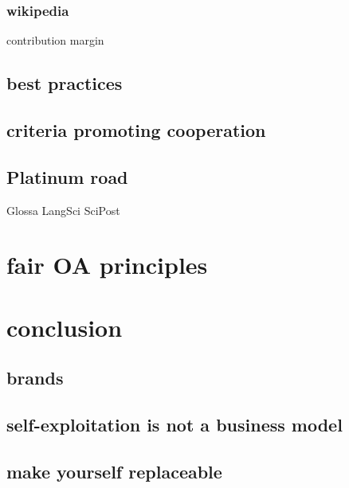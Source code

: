 \documentclass[12pt]{article}
\newcommand\wordcount{}
\begin{document}
\subsubsection{wikipedia}
            contribution margin
\subsection{best practices}
\subsection{criteria promoting cooperation}
\subsection{Platinum road}
            Glossa
            LangSci
            SciPost
\section{fair OA principles}
\section{conclusion}
\subsection{brands}
\subsection{self-exploitation is not a business model}
\subsection{make yourself replaceable}


\sloppy
\printbibliography


\wordcount
\end{document}
